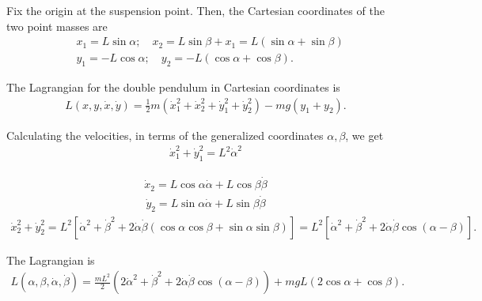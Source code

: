\begin{solution}[8.1]
Fix the origin at the suspension point. Then, the Cartesian coordinates of the two point masses are
\begin{align}
    &x_1 = L \sin \alpha ; \quad x_2 = L \sin \beta + x_1 = L(\sin \alpha + \sin \beta) \\
    &y_1 = -L\cos \alpha; \quad y_2 = -L(\cos \alpha + \cos \beta).
\end{align}

The Lagrangian for the double pendulum in Cartesian coordinates is 
\begin{align}
L (x, y, \dot{x}, \dot{y}) = \frac{1}{2}m (\dot{x}^2_1+ \dot{x}^2_2 + \dot{y}^2_1 + \dot{y}^2_2) - mg(y_1 + y_2).
\end{align}

Calculating the velocities, in terms of the generalized coordinates $\alpha, \beta$, we get
\begin{align}
\dot{x}_1^2 + \dot{y}^2_1 = L^2 \dot{\alpha}^2
\end{align}

\begin{align}
\dot{x}_2 = L\cos \alpha \dot{\alpha} + L \cos \beta \dot{\beta}
\end{align}
\begin{align}
\dot{y}_2 = L\sin \alpha \dot{\alpha} + L \sin \beta \dot{\beta}
\end{align}
\begin{align}
\dot{x}^2_2 + \dot{y}^2_2 = L^2[\dot{\alpha}^2 + \dot{\beta}^2 + 2\dot{\alpha}\dot{\beta}(\cos \alpha \cos \beta + \sin \alpha \sin \beta)] = L^2[\dot{\alpha}^2 + \dot{\beta}^2 + 2\dot{\alpha}\dot{\beta}\cos(\alpha - \beta)].
\end{align}

The Lagrangian is
\begin{align}
L(\alpha, \beta, \dot{\alpha}, \dot{\beta}) = \frac{mL^2}{2}(2\dot{\alpha}^2 + \dot{\beta}^2 + 2\dot{\alpha}\dot{\beta}\cos(\alpha - \beta)) + mgL(2\cos \alpha + \cos \beta ).
\end{align}


\end{solution}
